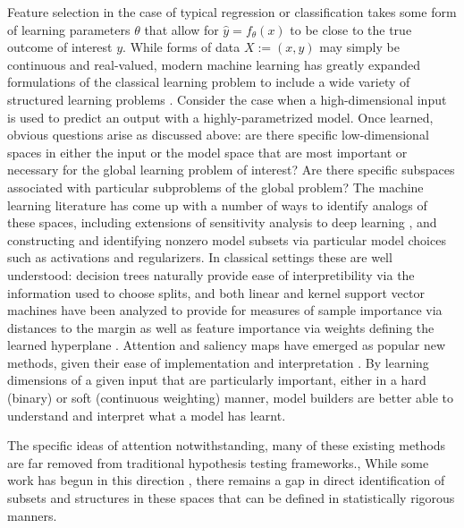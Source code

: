 Feature selection in the case of typical regression or classification
takes some form of learning parameters $\theta$ that allow for $\hat{y} = f_\theta(x)$ to be close to the true outcome of interest $y$.
While forms of data $X := (x,y)$ may simply be continuous and real-valued, modern machine learning has greatly expanded formulations of the classical learning problem to include a wide variety of structured learning problems \citep{nowozin2011structured}. 
Consider the case when a high-dimensional input is used to predict an output with a highly-parametrized model. 
Once learned, obvious questions arise as discussed above: are there specific low-dimensional spaces in either the input or the model space that are most important or necessary for the global learning problem of interest? Are there specific subspaces associated with particular subproblems of the global problem?
The machine learning literature has come up with a number of ways to identify analogs of these spaces, 
including extensions of sensitivity analysis to deep learning \citep{yeung2010sensitivity,zhang2015sensitivity}, and constructing and identifying nonzero model subsets via particular model choices such as activations \citep{selvaraju2017grad} and regularizers.
In classical settings these are well understood: decision trees naturally provide ease of interpretibility via the information used to choose splits, and both linear and kernel support vector machines have been analyzed to provide for measures of sample importance via distances to the margin as well as feature importance via weights defining the learned hyperplane \citep{Mitchell97}.
Attention and saliency maps have emerged as popular new methods,
given their ease of implementation and interpretation \citep{sutskever2014sequence,vaswani2017attention,selvaraju2017grad}.
By learning dimensions of a given input that are particularly important, either in a hard (binary) or soft (continuous weighting) manner, model builders are better able to understand and interpret what a model has learnt.

The specific ideas of attention notwithstanding, many of these existing methods are far removed from traditional hypothesis testing frameworks.,
While some work has begun in this direction \citep{tansey2018black},
there remains a gap in direct identification of subsets and structures in these spaces that can be defined in statistically rigorous manners.

